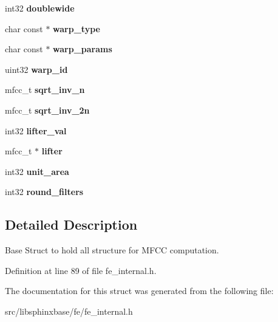 \begin{CompactItemize}
\item 
int32 \textbf{doublewide}\label{structmelfb__s_2f1a3b5e9a985a88dd0a0c57c8e8e682}

\item 
char const $\ast$ \textbf{warp\_\-type}\label{structmelfb__s_925f6f7a98b33b542f6b53f7c0b1b923}

\item 
char const $\ast$ \textbf{warp\_\-params}\label{structmelfb__s_a7ba71c21972a822ba7f23391ff92b21}

\item 
uint32 \textbf{warp\_\-id}\label{structmelfb__s_3b4d756c484accf39aeac42219b2c7ec}

\item 
mfcc\_\-t \textbf{sqrt\_\-inv\_\-n}\label{structmelfb__s_1d222190206f979da6f1297197bb6e6b}

\item 
mfcc\_\-t \textbf{sqrt\_\-inv\_\-2n}\label{structmelfb__s_09439f191bdf50d17505f0cfcabda229}

\item 
int32 \textbf{lifter\_\-val}\label{structmelfb__s_605228aea9e9c9028caad09060a07b2e}

\item 
mfcc\_\-t $\ast$ \textbf{lifter}\label{structmelfb__s_362672e537cb316c538fccc141ad01f8}

\item 
int32 \textbf{unit\_\-area}\label{structmelfb__s_9fc76cc06249cb211c35c04a31c8a3c1}

\item 
int32 \textbf{round\_\-filters}\label{structmelfb__s_c2db1578287bd1f5a9b5eed94cc0d987}

\end{CompactItemize}


\subsection{Detailed Description}
Base Struct to hold all structure for MFCC computation. 



Definition at line 89 of file fe\_\-internal.h.

The documentation for this struct was generated from the following file:\begin{CompactItemize}
\item 
src/libsphinxbase/fe/fe\_\-internal.h\end{CompactItemize}
